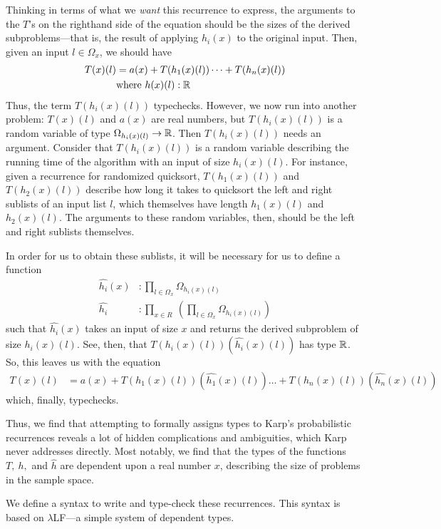 Thinking in terms of what we \emph{want} this recurrence to express, the arguments to the $T$'s on the righthand side of
the equation should be the sizes of the derived subproblems---that is, the result of applying $h_i(x)$ to the original input.
Then, given an input $l \in \Omega_x$, we should have
\begin{align*}
T(x)(l) &= a(x) + T(h_1(x)(l)) \dots + T(h_n(x)(l)) \\
&\text{where } h(x)(l) : \mathbb{R} 
\end{align*}
 Thus, the term $T(h_i(x)(l))$ typechecks. However, we now run into another problem: $T(x)(l)$ and $a(x)$ are real numbers,
but $T(h_i(x)(l))$ is a random variable of type $\Omega_{h_i(x)(l)} \rightarrow \mathbb{R}$. Then $T(h_i(x)(l))$ needs an argument.
Consider that $T(h_i(x)(l))$ is a random variable describing the running time of the algorithm with an input of size 
$h_i(x)(l)$. For instance, given a recurrence for randomized quicksort, $T(h_1(x)(l))$ and $T(h_2(x)(l))$ describe how long it 
takes to quicksort the left and right sublists of an input list $l$, which themselves have length $h_1(x)(l)$ and
$h_2(x)(l)$. The arguments to these random variables, then, should be the left and right sublists themselves. 

 In order for us to obtain these sublists, it will be necessary for us to define a function 
 \begin{align*}
 \hat{h_i}(x) &: \prod_{l \in \Omega_x} \Omega_{h_i(x)(l)} \\
 \hat{h_i} &: \prod_{x \in R} \ ( \prod_{l \in \Omega_x} \Omega_{h_i(x)(l)})
 \end{align*}
 such that $\hat{h_i}(x)$ takes an input of size $x$ and returns the derived subproblem of size $h_i(x)(l)$. See, then, that
 $T(h_i(x)(l))(\hat{h_i}(x)(l))$ has type $\mathbb{R}$. So, this leaves us with the equation
 \begin{align*}
 T(x)(l) &= a(x) + T(h_1(x)(l))(\hat{h_1}(x)(l)) \dots + T(h_n(x)(l))(\hat{h_n}(x)(l))
 \end{align*}
 which, finally, typechecks.
 
 Thus, we find that attempting to formally assigns types to Karp's probabilistic recurrences reveals a lot of hidden 
 complications and ambiguities, which Karp never addresses directly. Most notably, we find that the types of the 
 functions $T, \ h,$ and $\hat{h}$ are dependent upon a real number $x$, describing the size of problems in the sample space.
 
We define a syntax to write and type-check these recurrences. This syntax is based on $\lambda$LF---a simple system of 
dependent types. 
 
